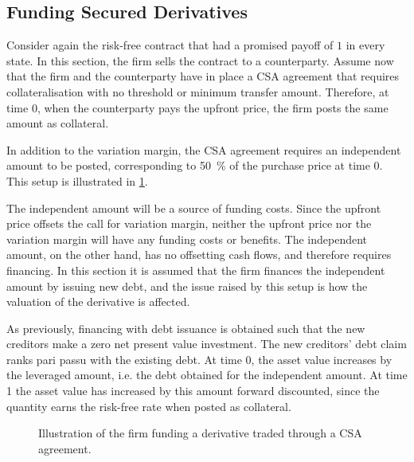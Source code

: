 \documentclass[main.tex]{subfiles}
\begin{document}
    \subsection{Funding Secured Derivatives}
    \label{sec:example-secured-derivative}
        Consider again the risk-free contract that had a promised payoff of $\num{1}$ in every state.
        In this section, the firm sells the contract to a counterparty.
        Assume now that the firm and the counterparty have in place a CSA agreement
        that requires collateralisation with no threshold or minimum transfer amount.
        Therefore, at time 0, when the counterparty pays the upfront price,
        the firm posts the same amount as collateral.

        In addition to the variation margin, 
        the CSA agreement requires an independent amount to be posted,
        corresponding to \qty[round-precision=0]{50}{\percent} of the purchase price at time 0.\
        \\
        This setup is illustrated in \cref{fig:mva-setup}.

        The independent amount will be a source of funding costs.
        Since the upfront price offsets the call for variation margin,
        neither the upfront price nor the variation margin will have any funding costs or benefits.
        The independent amount, on the other hand, has no offsetting cash flows, 
        and therefore requires financing.
        In this section it is assumed that the firm finances the independent amount by issuing new debt,
        and the issue raised by this setup is how the valuation of the derivative is affected.

        As previously, financing with debt issuance is obtained 
        such that the new creditors make a zero net present value investment.
        The new creditors' debt claim ranks pari passu with the existing debt.
        At time 0, the asset value increases by the leveraged amount,
        i.e. the debt obtained for the independent amount.
        At time 1 the asset value has increased by this amount forward discounted,
        since the quantity earns the risk-free rate when posted as collateral.
        \begin{figure}[t]
            \centering
            \caption{Illustration of the firm funding a derivative traded through a CSA agreement.}
            \label{fig:mva-setup}
        \end{figure}
\end{document}
